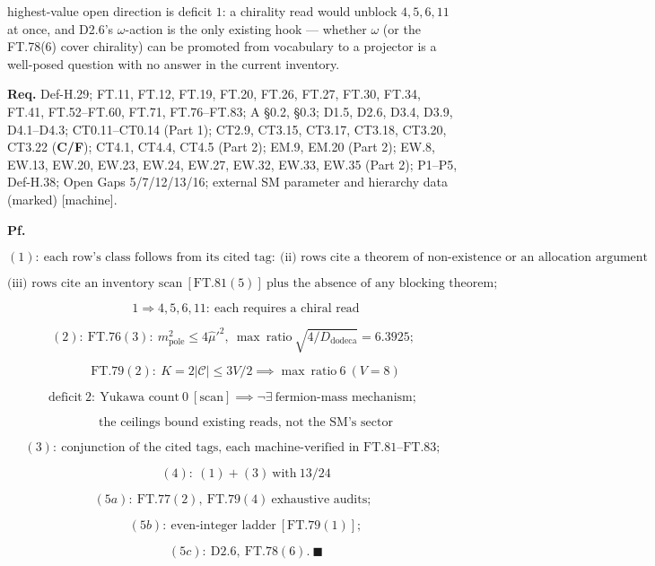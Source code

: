\documentclass[11pt,openany]{report}
\theoremstyle{canonplain}
\theoremstyle{canondef}
\begin{document}
highest-value open direction is deficit $1$: a chirality read would unblock $4,5,6,11$ at once, and D2.6's $\omega$-action is the only existing hook — whether $\omega$ (or the FT.78(6) cover chirality) can be promoted from vocabulary to a projector is a well-posed question with no answer in the current inventory.

\textbf{Req.} Def-H.29; FT.11, FT.12, FT.19, FT.20, FT.26, FT.27, FT.30, FT.34, FT.41, FT.52–FT.60, FT.71, FT.76–FT.83; A §0.2, §0.3; D1.5, D2.6, D3.4, D3.9, D4.1–D4.3; CT0.11–CT0.14 (Part 1); CT2.9, CT3.15, CT3.17, CT3.18, CT3.20, CT3.22 (\textbf{C/F}); CT4.1, CT4.4, CT4.5 (Part 2); EM.9, EM.20 (Part 2); EW.8, EW.13, EW.20, EW.23, EW.24, EW.27, EW.32, EW.33, EW.35 (Part 2); P1–P5, Def-H.38; Open Gaps 5/7/12/13/16; external SM parameter and hierarchy data (marked) [machine].

\textbf{Pf.}

\[
(1):\ \text{each row's class follows from its cited tag}:\ \text{(ii) rows cite a theorem of non-existence or an allocation argument}
\]

\[
\text{(iii) rows cite an inventory scan}\ [\mathrm{FT.81}(5)]\ \text{plus the absence of any blocking theorem};
\]

\[
\qquad 1\Rightarrow4,5,6,11:\ \text{each requires a chiral read}
\]

\[
(2):\ \mathrm{FT.76}(3):\ m^2_{\mathrm{pole}}\le4\hat\mu'^2,\ \max\ \text{ratio}\ \sqrt{4/D_{\mathrm{dodeca}}}=6.3925;
\]

\[
\qquad \mathrm{FT.79}(2):\ K=2|\mathcal C|\le3V/2\implies\max\ \text{ratio}\ 6\ (V=8)
\]

\[
\text{deficit}\ 2:\ \text{Yukawa count}\ 0\ [\text{scan}]\implies\neg\exists\ \text{fermion-mass mechanism};
\]

\[
\qquad \text{the ceilings bound existing reads, not the SM's sector}
\]

\[
(3):\ \text{conjunction of the cited tags, each machine-verified in FT.81–FT.83};
\]

\[
\qquad (4):\ (1)+(3)\ \text{with}\ 13/24
\]

\[
(5a):\ \mathrm{FT.77}(2),\ \mathrm{FT.79}(4)\ \text{exhaustive audits};
\]

\[
\qquad (5b):\ \text{even-integer ladder}\ [\mathrm{FT.79}(1)];
\]

\[
\qquad (5c):\ \mathrm{D2.6},\ \mathrm{FT.78}(6).\ \blacksquare
\]
\end{document}
